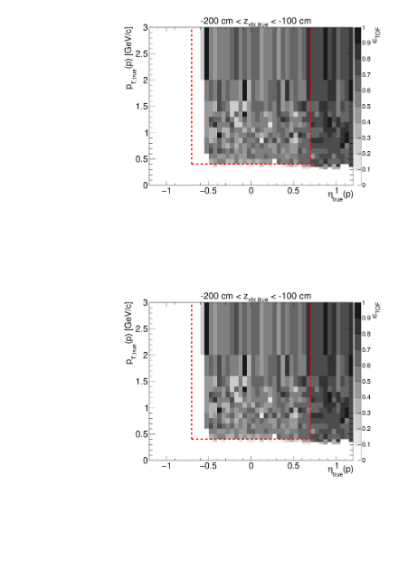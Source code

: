 \begin{figure}[hb]
{  \includegraphics[width=\linewidth,page=16]{graphics/eff/Eff2D_TOF_proton_Plus.pdf}\\
  \includegraphics[width=\linewidth,page=18]{graphics/eff/Eff2D_TOF_proton_Plus.pdf}
}%
\end{figure}
